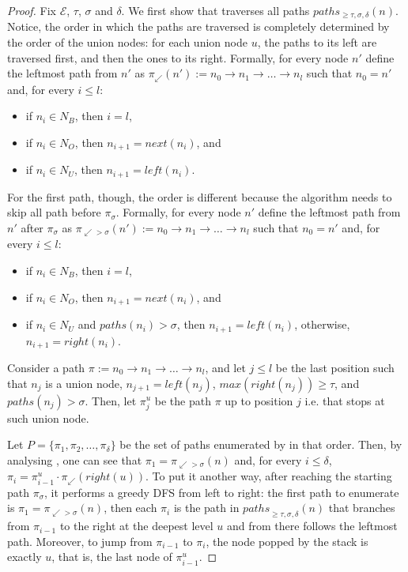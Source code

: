 \begin{proof}
  Fix $\mathcal{E}$, $\tau$, $\sigma$ and $\delta$. We first show that  traverses all paths $paths_{\ge \tau, \sigma, \delta}(n)$. Notice, the order in which the paths are traversed is completely determined by the order of the union nodes: for each union node $u$, the paths to its left are traversed first, and then the ones to its right. Formally, for every node $n'$ define the leftmost path from $n'$ as ${\pi_{\swarrow}(n') := n_{0} \rightarrow n_{1} \rightarrow \ldots \rightarrow n_{l}}$ such that $n_{0} = n'$ and, for every $i \le l$:

  \begin{itemize}
      \item if $n_{i} \in N_{B}$, then $i = l$,
      \item if $n_{i} \in N_{O}$, then $n_{i+1} = next(n_{i})$, and
      \item if $n_{i} \in N_{U}$, then $n_{i+1} = left(n_{i})$.
  \end{itemize}

  For the first path, though, the order is different because the algorithm needs to skip all path before $\pi_{\sigma}$. Formally, for every node $n'$ define the leftmost path from $n'$ after $\pi_{\sigma}$ as ${\pi_{\swarrow > \sigma}(n') := n_{0} \rightarrow n_{1} \rightarrow \ldots \rightarrow n_{l}}$ such that $n_{0} = n'$ and, for every $i \le l$:
  \begin{itemize}
      \item if $n_{i} \in N_{B}$, then $i = l$,
      \item if $n_{i} \in N_{O}$, then $n_{i+1} = next(n_{i})$, and
      \item if $n_{i} \in N_{U}$ and $paths(n_{i}) > \sigma$, then ${n_{i+1} = left(n_{i})}$, otherwise, ${n_{i+1} = right(n_{i})}$.
  \end{itemize}

  Consider a path $\pi := n_{0} \rightarrow n_{1} \rightarrow \ldots \rightarrow n_{l}$, and let $j \leq l$ be the last position such that $n_{j}$ is a union node, $n_{j+1} = left(n_{j})$, $max(right(n_{j})) \ge \tau$, and $paths(n_{j}) > \sigma$. Then, let $\pi^{u}_{j}$ be the path $\pi$ up to position $j$ i.e. that stops at such union node.

  Let $P = \{\pi_{1}, \pi_{2}, \ldots, \pi_{\delta}\}$ be the set of paths enumerated by  in that order. Then, by analysing , one can see that $\pi_{1} = \pi_{\swarrow > \sigma}(n)$ and, for every $i \le \delta$, $\pi_{i} = \pi^{u}_{i-1} \cdot \pi_{\swarrow}(right(u))$. To put it another way, after reaching the starting path $\pi_{\sigma}$, it performs a greedy DFS from left to right: the first path to enumerate is $\pi_{1} = \pi_{\swarrow > \sigma}(n)$, then each $\pi_{i}$ is the path in ${paths}_{\ge \tau, \sigma, \delta}(n)$ that branches from $\pi_{i-1}$ to the right at the deepest level $u$ and from there follows the leftmost path. Moreover, to jump from $\pi_{i-1}$ to $\pi_{i}$, the node popped by the stack is exactly $u$, that is, the last node of $\pi^{u}_{i-1}$.


\end{proof}
